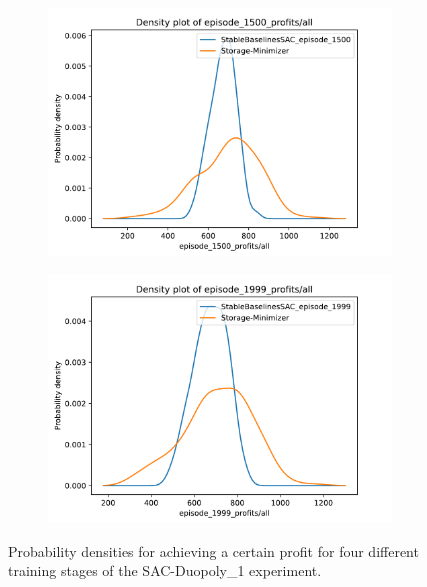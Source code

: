 \begin{figure}
\begin{subfigure}{0.49\textwidth}
		\label{fig:SACDuopolyProfitsDensity2}
	\end{subfigure}
	\begin{subfigure}{0.49\textwidth}
		\centering
		\includegraphics[width = \textwidth]{images/experiments/SACDuopoly/SACDuopolyProfitsDensity3.pdf}\\[1 ex]
		\label{fig:SACDuopolyProfitsDensity3}
	\end{subfigure}
	\begin{subfigure}{0.49\textwidth}
		\centering
		\includegraphics[width = \textwidth]{images/experiments/SACDuopoly/SACDuopolyProfitsDensity4.pdf}\\[1 ex]
		\label{fig:SACDuopolyProfitsDensity4}
	\end{subfigure}
	\caption{Probability densities for achieving a certain profit for four different training stages of the SAC-Duopoly\_1 experiment.}\label{fig:SACDuopolyProfitsDensity}
\end{figure}

